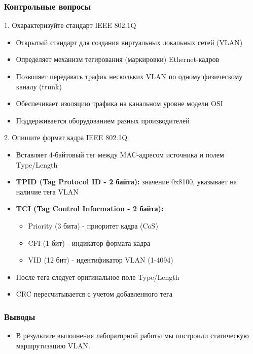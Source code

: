\begin{frame}

\frametitle{Контрольные вопросы}

\begin{block}{1. Охарактеризуйте стандарт IEEE 802.1Q}
\begin{itemize}
    \item Открытый стандарт для создания виртуальных локальных сетей (VLAN)
    \item Определяет механизм тегирования (маркировки) Ethernet-кадров
    \item Позволяет передавать трафик нескольких VLAN по одному физическому каналу (trunk)
    \item Обеспечивает изоляцию трафика на канальном уровне модели OSI
    \item Поддерживается оборудованием разных производителей
\end{itemize}
\end{block}

\begin{block}{2. Опишите формат кадра IEEE 802.1Q}
\begin{itemize}
    \item Вставляет 4-байтовый тег между MAC-адресом источника и полем Type/Length
    \item \textbf{TPID (Tag Protocol ID - 2 байта):} значение 0x8100, указывает на наличие тега VLAN
    \item \textbf{TCI (Tag Control Information - 2 байта):}
    \begin{itemize}
        \item Priority (3 бита) - приоритет кадра (CoS)
        \item CFI (1 бит) - индикатор формата кадра
        \item VID (12 бит) - идентификатор VLAN (1-4094)
    \end{itemize}
    \item После тега следует оригинальное поле Type/Length
    \item CRC пересчитывается с учетом добавленного тега
\end{itemize}
\end{block}

\end{frame}

\begin{frame}
\frametitle{Выводы}
\begin{itemize}
    \item В результате выполнения лабораторной работы мы построили статическую маршрутизацию VLAN.
\end{itemize}
\end{frame}


